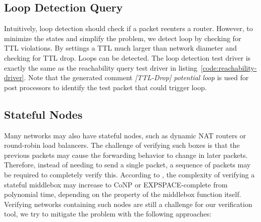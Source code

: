\documentclass[letterpaper, 10 pt, conference]{ieeeconf}  %
\begin{document}
\subsection{Loop Detection Query}
Intuitively, loop detection should check if a packet reenters a router. However, to minimize the states and simplify the problem, we detect loop by checking for TTL violations. By settings a TTL much larger than network diameter and checking for TTL drop. Loops can be detected. The loop detection test driver is exactly the same as the reachability query test driver in listing~\ref{code:reachability-driver}. Note that the generated comment \emph{[TTL-Drop] potential loop} is used for post processors to identify the test packet that could trigger loop.

\subsection{Stateful Nodes}
\label{sec:stateful}
Many networks may also have stateful nodes, such as dynamic NAT routers or round-robin load balancers. 
The challenge of verifying such boxes is that the previous packets may cause the forwarding behavior to change in later packets. 
Therefore, instead of needing to send a single packet, a sequence of packets may be required to completely verify this. 
According to \cite{stateful_verification_complexity}, the complexity of verifying a stateful middlebox may increase to CoNP or EXPSPACE-complete from polynomial time, depending on the property of the middlebox function itself. 
Verifying networks containing such nodes are still a challenge for our verification tool\cite{stateful_verification_complexity}, we try to mitigate the problem with the following approaches:
\end{document}
